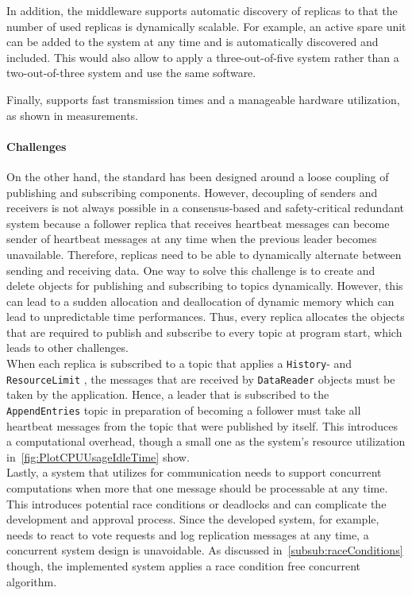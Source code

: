 In addition, the middleware supports automatic discovery of replicas to that the number of used replicas is dynamically scalable.
For example, an active spare unit can be added to the system at any time and is automatically discovered and included.
This would also allow to apply a three-out-of-five system rather than a two-out-of-three system and use the same software.

Finally,  supports fast transmission times and a manageable hardware utilization, as shown in measurements.

\paragraph{Challenges}
On the other hand, the  standard has been designed around a loose coupling of publishing and subscribing components.
However, decoupling of senders and receivers is not always possible in a consensus-based and safety-critical redundant system because a follower replica that receives heartbeat messages can become sender of heartbeat messages at any time when the previous leader becomes unavailable.
Therefore, replicas need to be able to dynamically alternate between sending and receiving data.
One way to solve this challenge is to create and delete objects for publishing and subscribing to topics dynamically.
However, this can lead to a sudden allocation and deallocation of dynamic memory which can lead to unpredictable time performances.
Thus, every replica allocates the objects that are required to publish and subscribe to every topic at program start, which leads to other challenges.
\\

When each replica is subscribed to a topic that applies a \texttt{History}- and \texttt{ResourceLimit} , the messages that are received by \texttt{DataReader} objects must be taken by the application.
Hence, a leader that is subscribed to the \texttt{AppendEntries} topic in preparation of becoming a follower must take all heartbeat messages from the topic that were published by itself.
This introduces a computational overhead, though a small one as the system's resource utilization in~\autoref{fig:PlotCPUUsageIdleTime} show.
\\

Lastly, a system that utilizes  for communication needs to support concurrent computations when more that one message should be processable at any time.
This introduces potential race conditions or deadlocks and can complicate the development and approval process.
Since the developed system, for example, needs to react to vote requests and log replication messages at any time, a concurrent system design is unavoidable.
As discussed in~\autoref{subsub:raceConditions} though, the implemented system applies a race condition free concurrent algorithm.




